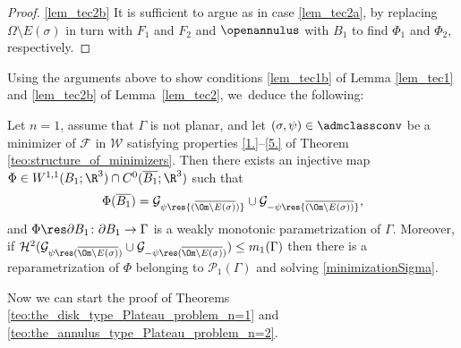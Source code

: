 \begin{proof}
\ref{lem_tec2b}
It is sufficient to argue as in case \ref{lem_tec2a},
by replacing $\Omega\setminus E(\sigma)$ in turn with $F_1$ and $F_2$ and
$\openannulus$ with $B_1$ to find $\Phi_1$ and $\Phi_2$, respectively.
\end{proof}

Using the arguments above to show conditions \ref{lem_tec1b} of Lemma \ref{lem_tec1} and \ref{lem_tec2b} of Lem\-ma~\ref{lem_tec2}, we~deduce the following:

\begin{cor}\label{lem_tec3}
Let $n=1$, assume that $\Gamma$ is not planar, and let $(\sigma,\psi)\in\admclassconv$ be a minimizer of
$\mathcal F$ in
$\mathcal W$
satisfying properties \ref{1.}--\ref{5.} of Theorem \ref{teo:structure_of_minimizers}. Then there exists an injective map $\Phi\in W^{1,1}(B_1;\R^3)\cap C^0(\overline{B_1};\R^3)$ such that
\[
\Phi(\overline{B_1})=\mathcal G_{\psi\res {(\overline{\Om\setminus E(\sigma)})}}
\cup\mathcal G_{-\psi\res{\overline{(\Om\setminus E(\sigma))}}},
\]
and $\Phi\res \partial B_1\colon\partial B_1\to \Gamma$ is a weakly monotonic parametrization of $\Gamma$. Moreover, if $\mathcal H^2(\mathcal G_{\psi\res (\overline{\Om\setminus E(\sigma)})}
\cup\mathcal G_{-\psi\res(\overline{\Om\setminus E(\sigma)})})\leq m_1(\Gamma)$ then there is a reparametrization
of $\Phi$ belonging to $\mathcal P_1(\Gamma)$ and solving \eqref{minimizationSigma}.
\end{cor}

Now we can start the proof of Theorems \ref{teo:the_disk_type_Plateau_problem_n=1} and
\ref{teo:the_annulus_type_Plateau_problem_n=2}.


